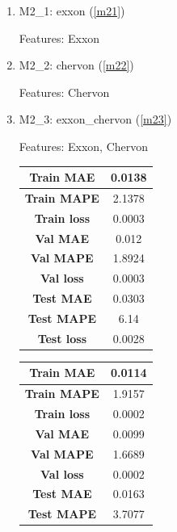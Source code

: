 \begin{enumerate}
	\item M2\_1: exxon (\autoref{m21})
	
	Features: Exxon
	
	\item M2\_2: chervon (\autoref{m22})
	
	Features: Chervon
	
	\item M2\_3: exxon\_chervon (\autoref{m23})
	
	Features: Exxon, Chervon
	
	\begin{table}[H]
		\centering
		\begin{minipage}{0.3\textwidth}
			\centering
			\begin{tabular}{|c|c|}
				\hline
				\textbf{Train MAE}  & 0.0138 \\
				\hline
				\textbf{Train MAPE} & 2.1378 \\
				\hline
				\textbf{Train loss} & 0.0003 \\
				\hline
				\textbf{Val MAE}    & 0.012  \\
				\hline
				\textbf{Val MAPE}   & 1.8924 \\
				\hline
				\textbf{Val loss}   & 0.0003 \\
				\hline
				\textbf{Test MAE}   & 0.0303 \\
				\hline
				\textbf{Test MAPE}  & 6.14   \\
				\hline
				\textbf{Test loss}  & 0.0028 \\
				\hline
			\end{tabular}
			\label{m21}
		\end{minipage}
		\begin{minipage}{0.3\textwidth}
			\centering
			\begin{tabular}{|c|c|}
				\hline
				\textbf{Train MAE}  & 0.0114 \\
				\hline
				\textbf{Train MAPE} & 1.9157 \\
				\hline
				\textbf{Train loss} & 0.0002 \\
				\hline
				\textbf{Val MAE}    & 0.0099 \\
				\hline
				\textbf{Val MAPE}   & 1.6689 \\
				\hline
				\textbf{Val loss}   & 0.0002 \\
				\hline
				\textbf{Test MAE}   & 0.0163 \\
				\hline
				\textbf{Test MAPE}  & 3.7077 \\

\end{tabular}
\end{minipage}
\end{table}
\end{enumerate}
